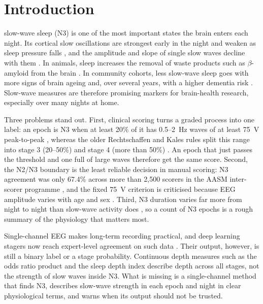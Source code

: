 \section{Introduction}
 slow-wave sleep (N3) is one of the most important states the brain enters each night. Its cortical slow oscillations are strongest early in the night and weaken as sleep pressure falls \cite{borbely2016twoprocess}, and the amplitude and slope of single slow waves decline with them \cite{riedner2007slowwaves,tononi2014plasticity}. In animals, sleep increases the removal of waste products such as $\beta$-amyloid from the brain \cite{xie2013clearance}. In community cohorts, less slow-wave sleep goes with more signs of brain ageing \cite{baril2021brainaging} and, over several years, with a higher dementia risk \cite{himali2023dementia}. Slow-wave measures are therefore promising markers for brain-health research, especially over many nights at home.

Three problems stand out. First, clinical scoring turns a graded process into one label: an epoch is N3 when at least 20\% of it has 0.5--2~Hz waves of at least 75~\textmu V peak-to-peak \cite{aasm2020manual}, whereas the older Rechtschaffen and Kales rules split this range into stage 3 (20--50\%) and stage 4 (more than 50\%) \cite{rechtschaffen1968manual}. An epoch that just passes the threshold and one full of large waves therefore get the same score. Second, the N2/N3 boundary is the least reliable decision in manual scoring: N3 agreement was only 67.4\% across more than 2,500 scorers in the AASM inter-scorer programme \cite{rosenberg2013interscorer}, and the fixed 75~\textmu V criterion is criticised because EEG amplitude varies with age and sex \cite{davidson2025n3,rosinvil2021age}. Third, N3 duration varies far more from night to night than slow-wave activity does \cite{qin2026swa,mullins2024stability}, so a count of N3 epochs is a rough summary of the physiology that matters most.

Single-channel EEG makes long-term recording practical, and deep learning stagers now reach expert-level agreement on such data \cite{supratak2017deepsleepnet,supratak2020tinysleepnet,eldele2021attnsleep,phan2023lseqsleepnet,perslev2021usleep,vallat2021yasa,phan2022review}. Their output, however, is still a binary label or a stage probability. Continuous depth measures such as the odds ratio product \cite{younes2015orp} and the sleep depth index \cite{zhou2025sdi} describe depth across all stages, not the strength of slow waves inside N3. What is missing is a single-channel method that finds N3, describes slow-wave strength in each epoch and night in clear physiological terms, and warns when its output should not be trusted.

